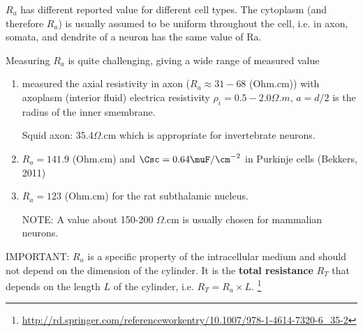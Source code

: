 \begin{enumerate}
\begin{itemize}
\label{sec:axial-resistivity}

$R_a$ has different reported value for different cell types.
The cytoplasm (and therefore $R_a$) is usually assumed to be uniform throughout
the cell, i.e. in axon, somata, and dendrite of a neuron has the same value of
Ra.

Measuring $R_a$ is quite challenging, giving a wide range of measured value
\begin{enumerate}
  \item \citep{carpenter1975} measured the axial resistivity in axon 
  ($R_a \approx 31-68$ (Ohm.cm)) with axoplasm (interior fluid) electrica
  resistivity $\rho_i = 0.5-2.0 \Omega.m$, $a=d/2$ is the radius of the inner smembrane.

Squid axon: 35.4$\Omega$.cm which is appropriate for invertebrate neurons.


    \item $R_a = 141.9$ (Ohm.cm) and $\Csc  = 0.64 \muF/\cm^{-2}$ in Purkinje
    cells (Bekkers, 2011)

   \item $R_a = 123$ (Ohm.cm) for the rat subthalamic nucleus.
    
NOTE: A value about 150-200 $\Omega$.cm is usually chosen for mammalian neurons.

\end{enumerate}

IMPORTANT: $R_a$ is a specific property of the intracellular medium and should
not depend on the dimension of the cylinder. It is the {\bf total resistance}
$R_T$ that depends on the length $L$ of the cylinder, i.e. 
$R_T = R_a \times L$.
\footnote{\url{http://rd.springer.com/referenceworkentry/10.1007/978-1-4614-7320-6_35-2}}


\end{itemize}
\end{enumerate}
